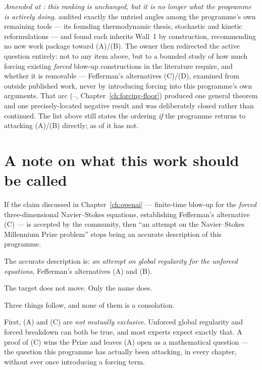 \emph{Amended at : this ranking is unchanged, but it is no longer what
the programme is actively doing.}  audited exactly the untried angles
among the programme's own remaining tools --- its founding thermodynamic
thesis, stochastic and kinetic reformulations --- and found each inherits
Wall~1 by construction, recommending no new work package toward (A)/(B). The
owner then redirected the active question entirely: not to any item above,
but to a bounded study of how much forcing existing \emph{forced} blow-up
constructions in the literature require, and whether it is removable ---
Fefferman's alternatives (C)/(D), examined from outside published work, never
by introducing forcing into this programme's own arguments. That arc
(--, Chapter~\ref{ch:forcing-floor}) produced one general
theorem and one precisely-located negative result and was deliberately closed
rather than continued. The list above still states the ordering \emph{if} the
programme returns to attacking (A)/(B) directly; as of  it has not.

\section{A note on what this work should be called}
\label{sec:naming}

\begin{record}
If the claim discussed in Chapter~\ref{ch:openai} --- finite-time blow-up for
the \emph{forced} three-dimensional Navier--Stokes equations, establishing
Fefferman's alternative (C) --- is accepted by the community, then ``an
attempt on the Navier--Stokes Millennium Prize problem'' stops being an
accurate description of this programme.

\smallskip
The accurate description is: \emph{an attempt on global regularity for the
unforced equations}, Fefferman's alternatives (A) and (B).

\smallskip
The target does not move. Only the name does.
\end{record}

Three things follow, and none of them is a consolation.

First, (A) and (C) are \emph{not mutually exclusive}. Unforced global
regularity and forced breakdown can both be true, and most experts expect
exactly that. A proof of (C) wins the Prize and leaves (A) open as a
mathematical question --- the question this programme has actually been
attacking, in every chapter, without ever once introducing a forcing term.

